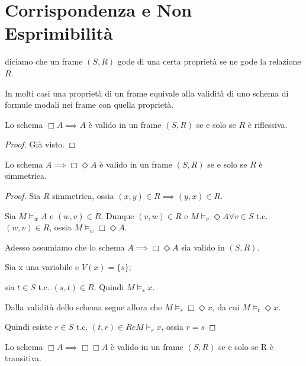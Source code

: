 \documentclass[../main.tex]{subfiles}
\begin{document}
\section{Corrispondenza e Non Esprimibilità}
\begin{definition}
    diciamo che un frame $(S,R)$ gode di una certa proprietà se ne gode la relazione $R$.

    In molti casi una proprietà di un frame equivale alla validità di uno schema di formule modali nei frame con quella proprietà.
\end{definition}
\begin{theorem}
    Lo schema $\Box A \implies A$ è valido in un frame $(S,R)$ se e solo se $R$ è riflessiva.
\end{theorem}
\begin{proof}
    Già visto.
\end{proof}
\begin{theorem}
    Lo schema $ A \implies \Box \Diamond A$ è valido in un frame $(S,R)$ se e solo se $R$ è simmetrica.
\end{theorem}
\begin{proof}
    Sia $R$ simmetrica, ossia $(x,y) \in R \implies (y,x) \in R$.

    Sia $M \vDash_w A$ e $(w,v) \in R$. Dunque $(v,w) \in R$ e $M \vDash_v \Diamond A \forall v \in S$ t.c. $(w,v) \in R$, ossia $M \vDash_w \Box \Diamond A$.

    Adesso assumiamo che lo schema $A \implies \Box \Diamond A $ sia valido in $(S,R)$.

    Sia x una variabile e $V(x) = \{s\}$;

    sia $t \in S$ t.c. $(s,t) \in R$. Quindi $M \vDash_s x$.

    Dalla validità dello schema segue allora che $M \vDash_s \Box \Diamond x$, da cui $M \vDash_t \Diamond x$.

    Quindi esiste $r \in S$ t.c. $(t,r) \in R e M \vDash_r x$, ossia $r = s$
\end{proof}
\begin{theorem}
    Lo schema $\Box A \implies \Box \Box A$ è valido in un frame $(S,R)$ se e solo se R è transitiva.
\end{theorem}
\end{document}
